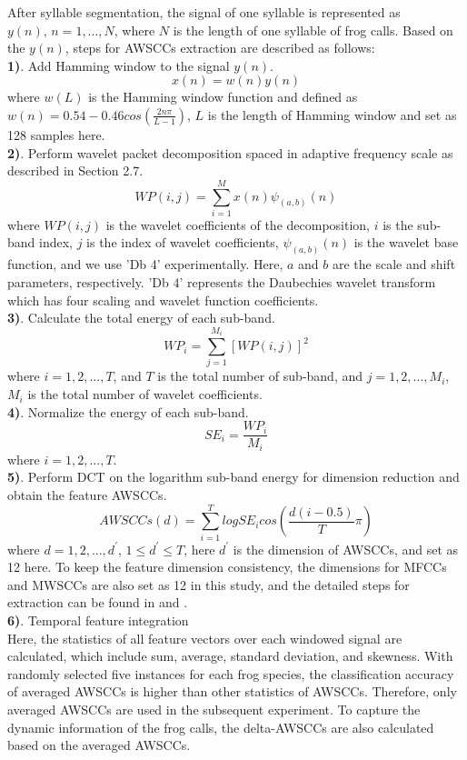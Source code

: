After syllable segmentation, the signal of one syllable is represented as 
$y(n),\,n = 1,...,N$, where $N$ is the length of one syllable of frog calls. Based on the $y(n)$, steps for AWSCCs extraction are described as follows:\\
\textbf{1)}. Add Hamming window to the signal $y(n)$.
\begin{equation}
x(n) = w(n)y(n)
\end{equation}
\noindent where $w(L)$ is the Hamming window function and defined as $w(n)=0.54-0.46cos(\frac{2n\pi}{L-1}) $, $L$ is the length of Hamming window and set as 128 samples here.
\\
\textbf{2)}. Perform wavelet packet decomposition spaced in adaptive frequency scale as described in Section 2.7.
\begin{equation}
WP(i,j)=\sum_{i=1}^{M}x(n)\psi_{(a,b)}(n) 
\end{equation}
\noindent where $WP(i,j)$ is the wavelet coefficients of the decomposition, $i$ is the sub-band index, $j$ is the index of wavelet coefficients, $\psi_{(a,b)}(n)$ is the wavelet base function, and we use 'Db 4' experimentally. Here, $a$ and $b$ are the scale and shift parameters, respectively. 'Db 4' represents the Daubechies wavelet transform which has four scaling and wavelet function coefficients.
\\
\textbf{3)}. Calculate the total energy of each sub-band.
\begin{equation}
WP_{i}=\sum_{j=1}^{M_{i}}[WP(i,j)]^2
\end{equation}
\noindent where $i=1,2,...,T$, and $T$ is the total number of sub-band, and $j=1,2,...,M_{i}$, $M_{i}$ is the total number of wavelet coefficients.
\\
\textbf{4)}. Normalize the energy of each sub-band.
\begin{equation}
SE_{i}=\frac{WP_{i}}{M_{i}}
\end{equation}
\noindent where $i=1,2,...,T$.
\\
\textbf{5)}. Perform DCT on the logarithm sub-band energy for dimension reduction and obtain the feature AWSCCs.
\begin{equation}
AWSCCs(d)=\sum_{i=1}^{T}logSE_{i}cos(\frac{d(i-0.5)}{T}\pi)
\end{equation}
\noindent where $d=1,2,...,d^{'}$, $1 \leq d^{'} \leq T$, here $d^{'}$ is the dimension of AWSCCs, and set as 12 here. To keep the feature dimension consistency, the dimensions for MFCCs and MWSCCs are also set as 12 in this study, and the detailed steps for extraction can be found in \citep{bedoya2014automatic} and \citep{Zhang2015108}.
\\
\textbf{6)}. Temporal feature integration
\\
Here, the statistics of all feature vectors over each windowed signal are calculated, which include sum, average, standard deviation, and skewness. With randomly selected five instances for each frog species, the classification accuracy of averaged AWSCCs is higher than other statistics of AWSCCs. Therefore, only averaged AWSCCs are used in the subsequent experiment. To capture the dynamic information of the frog calls, the delta-AWSCCs are also calculated based on the averaged AWSCCs. 




